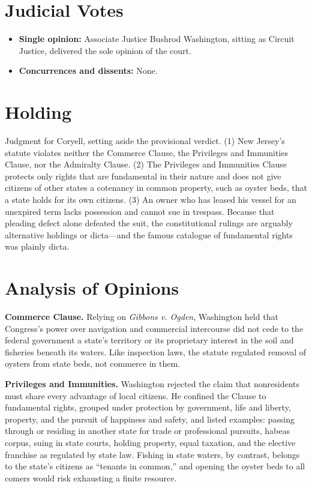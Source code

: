 \documentclass[12pt]{article}
\begin{document}
\section{Judicial Votes}

\begin{itemize}
\item \textbf{Single opinion:} Associate Justice Bushrod Washington, sitting as Circuit Justice, delivered the sole opinion of the court.
\item \textbf{Concurrences and dissents:} None.
\end{itemize}

\section{Holding}

Judgment for Coryell, setting aside the provisional verdict. (1) New Jersey's statute violates neither the Commerce Clause, the Privileges and Immunities Clause, nor the Admiralty Clause. (2) The Privileges and Immunities Clause protects only rights that are fundamental in their nature and does not give citizens of other states a cotenancy in common property, such as oyster beds, that a state holds for its own citizens. (3) An owner who has leased his vessel for an unexpired term lacks possession and cannot sue in trespass. Because that pleading defect alone defeated the suit, the constitutional rulings are arguably alternative holdings or dicta---and the famous catalogue of fundamental rights was plainly dicta.

\section{Analysis of Opinions}

\textbf{Commerce Clause.} Relying on \textit{Gibbons v. Ogden}, Washington held that Congress's power over navigation and commercial intercourse did not cede to the federal government a state's territory or its proprietary interest in the soil and fisheries beneath its waters. Like inspection laws, the statute regulated removal of oysters from state beds, not commerce in them.

\textbf{Privileges and Immunities.} Washington rejected the claim that nonresidents must share every advantage of local citizens. He confined the Clause to fundamental rights, grouped under protection by government, life and liberty, property, and the pursuit of happiness and safety, and listed examples: passing through or residing in another state for trade or professional pursuits, habeas corpus, suing in state courts, holding property, equal taxation, and the elective franchise as regulated by state law. Fishing in state waters, by contrast, belongs to the state's citizens as ``tenants in common,'' and opening the oyster beds to all comers would risk exhausting a finite resource.
\end{document}
